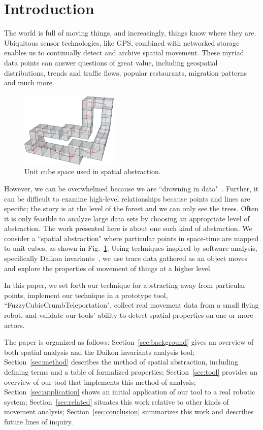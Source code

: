 \section{Introduction}

The world is full of moving things, and increasingly, things know where they are. 
Ubiquitous sensor technologies, like GPS, combined with networked storage enables us to continually detect and archive spatial movement.
These myriad data points can answer questions of great value, including geospatial distributions, trends and traffic flows, popular restaurants, migration patterns and much more.

\begin{figure}
  \centering
  \includegraphics[width=0.42\textwidth]{./figures/path_overview}
  \caption{Unit cube space used in spatial abstraction.}
  \label{fig:unitCubes}
\end{figure}

However, we can be overwhelmed because we are ``drowning in data"~\cite{morse1993drowning}.
Further, it can be difficult to examine high-level relationships because points and lines are specific; the story is at the level of the forest and we can only see the trees.  
Often it is only feasible to analyze large data sets by choosing an appropriate level of abstraction.
The work presented here is about one such kind of abstraction.
We consider a ``spatial abstraction" where particular points in space-time are mapped to unit cubes, as shown in Fig.~\ref{fig:unitCubes}.
Using techniques inspired by software analysis, specifically Daikon invariants~\cite{kataoka2001automated}, we use trace data gathered as an object moves and explore the properties of movement of things at a higher level.

In this paper, we set forth our technique for abstracting away from particular points, 
implement our technique in a prototype tool, ``FuzzyCubicCrumbTeleportation", 
collect real movement data from a small flying robot, 
and validate our tools' ability to detect spatial properties on one or more actors.

The paper is organized as follows:
Section~\ref{sec:background} gives an overview of both spatial analysis and the Daikon invariants analysis tool;
Section~\ref{sec:method} describes the method of spatial abstraction, including defining terms and a table of formalized properties;
Section~\ref{sec:tool} provides an overview of our tool that implements this method of analysis;
Section~\ref{sec:application} shows an initial application of our tool to a real robotic system;
Section~\ref{sec:related} situates this work relative to other kinds of movement analysis;
Section~\ref{sec:conclusion} summarizes this work and describes future lines of inquiry. 




